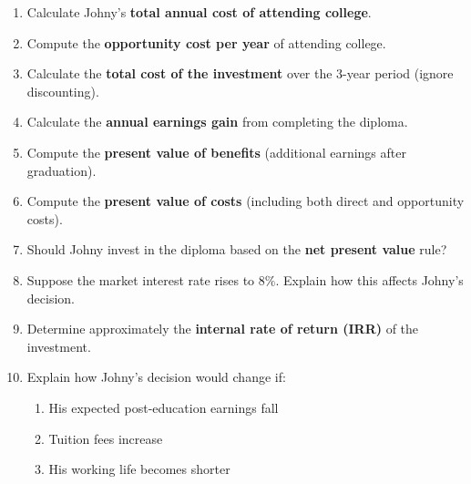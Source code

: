 \documentclass[12pt]{article}
\begin{document}
\begin{enumerate}
    \item Calculate Johny’s \textbf{total annual cost of attending college}.
    
    \item Compute the \textbf{opportunity cost per year} of attending college.
    
    \item Calculate the \textbf{total cost of the investment} over the 3-year period (ignore discounting).
    
    \item Calculate the \textbf{annual earnings gain} from completing the diploma.
    
    \item Compute the \textbf{present value of benefits} (additional earnings after graduation).
    
    \item Compute the \textbf{present value of costs} (including both direct and opportunity costs).
    
    \item Should Johny invest in the diploma based on the \textbf{net present value} rule?
    
    \item Suppose the market interest rate rises to \(8\%\). Explain how this affects Johny’s decision.
    
    \item Determine approximately the \textbf{internal rate of return (IRR)} of the investment.
    
    \item Explain how Johny’s decision would change if:

    \begin{enumerate}[label=(\alph*)]
        \item  His expected post-education earnings fall
        \item Tuition fees increase
        \item His working life becomes shorter
    \end{enumerate}

\end{enumerate}
\end{document}
